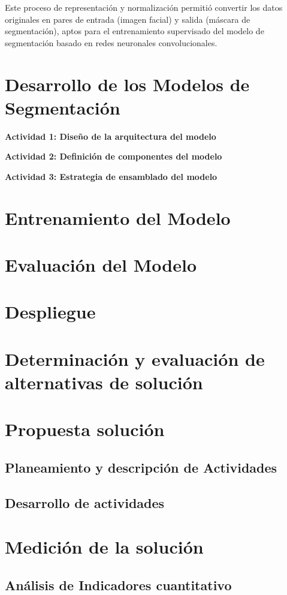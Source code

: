 Este proceso de representación y normalización permitió convertir los datos originales en pares de entrada (imagen facial) y salida (máscara de segmentación), aptos para el entrenamiento supervisado del modelo de segmentación basado en redes neuronales convolucionales.

\section{Desarrollo de los Modelos de Segmentación}

\textbf{Actividad 1: Diseño de la arquitectura del modelo}

\textbf{Actividad 2: Definición de componentes del modelo}

\textbf{Actividad 3: Estrategia de ensamblado del modelo}

\section{Entrenamiento del Modelo}

\section{Evaluación del Modelo}

\section{Despliegue}

\section{Determinación y evaluación de alternativas de solución}

\section{Propuesta solución}

\subsection{Planeamiento y descripción de Actividades}

\subsection{Desarrollo de actividades}

\section{Medición de la solución}

\subsection{Análisis de Indicadores cuantitativo}
